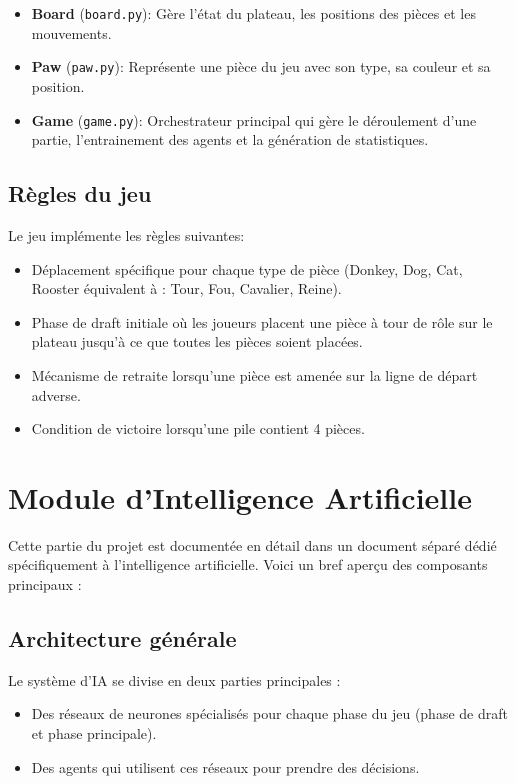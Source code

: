 \documentclass[]{article}
\begin{document}
\begin{itemize}
  \item \textbf{Board} (\texttt{board.py}): Gère l'état du plateau, les positions des pièces et les mouvements.
  \item \textbf{Paw} (\texttt{paw.py}): Représente une pièce du jeu avec son type, sa couleur et sa position.
  \item \textbf{Game} (\texttt{game.py}): Orchestrateur principal qui gère le déroulement d'une partie, l'entrainement des agents et la génération de statistiques.
\end{itemize}

\subsection{Règles du jeu}
Le jeu implémente les règles suivantes:
\begin{itemize}
  \item Déplacement spécifique pour chaque type de pièce (Donkey, Dog, Cat, Rooster équivalent à : Tour, Fou, Cavalier, Reine).
  \item Phase de draft initiale où les joueurs placent une pièce à tour de rôle	sur le plateau jusqu'à ce que toutes les pièces soient placées.
  \item Mécanisme de retraite lorsqu'une pièce est amenée sur la ligne de départ adverse.
  \item Condition de victoire lorsqu'une pile contient 4 pièces.
\end{itemize}

\section{Module d'Intelligence Artificielle}

Cette partie du projet est documentée en détail dans un document séparé dédié spécifiquement à l'intelligence artificielle. Voici un bref aperçu des composants principaux :

\subsection{Architecture générale}
Le système d'IA se divise en deux parties principales :
\begin{itemize}
  \item Des réseaux de neurones spécialisés pour chaque phase du jeu (phase de draft et phase principale).
  \item Des agents qui utilisent ces réseaux pour prendre des décisions.
\end{itemize}
\end{document}
